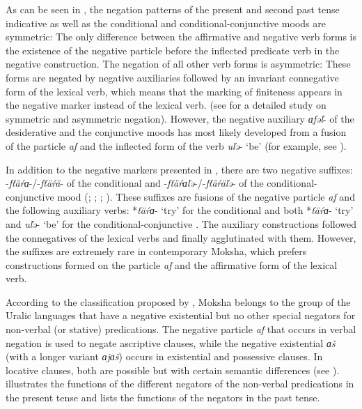\documentclass[output=paper,colorlinks,citecolor=brown,draft,draftmode]{langscibook}
\begin{document}
 As can be seen in , the negation patterns of the present and second past tense indicative as well as the conditional and conditional-conjunctive moods are symmetric: The only difference between the affirmative and negative verb forms is the existence of the negative particle before the inflected predicate verb in the negative construction. The negation of all other verb forms is asymmetric: These forms are negated by negative auxiliaries followed by an invariant connegative form of the lexical verb, which means that the marking of finiteness appears in the negative marker instead of the lexical verb. (see \citet{Miestamo2005} for a detailed study on symmetric and asymmetric negation). However, the negative auxiliary \textit{ɑfəľ}- of the desiderative and the conjunctive moods has most likely developed from a fusion of the particle \textit{af} and the inflected form of the verb \textit{uľə}- `be' (for example, see \citealt[142]{Bartens1999}).

  In addition to the negative markers presented in , there are two negative suffixes: -\textit{fťäŕɑ}-/-\textit{fťäŕä}- of the conditional and -\textit{fťäŕɑľə}-/-\textit{fťäŕäľə}- of the condi\-tion\-al-conjunctive mood (\citealt[392--393]{Klemm1934}; \citealt[012]{Paasonen1953}; \citealt[221]{Pall1957}; \citealt[141]{Bartens1999}).
  These suffixes are fusions of the negative particle \textit{af} and the following auxiliary verbs: *\textit{ťäŕɑ}- `try' for the conditional and both *\textit{ťäŕɑ}- `try' and \textit{uľə}- `be' for the conditional-conjunctive \citep[129--137]{Bartens1999}. The auxiliary constructions followed the connegatives of the lexical verbs and finally agglutinated with them. However, the suffixes are extremely rare in contemporary Moksha, which prefers constructions formed on the particle \textit{af} and the affirmative form of the lexical verb.

  According to the classification proposed by \citet{Veselinova2015}, Moksha belongs to the group of the Uralic languages that have a negative existential but no other special negators for non-verbal (or stative) predications. The negative particle \textit{af} that occurs in verbal negation is used to negate ascriptive clauses, while the negative existential \textit{ɑš} (with a longer variant \textit{ɑjɑš}) occurs in existential and possessive clauses. In locative clauses, both are possible but with certain semantic differences (see ).  illustrates the functions of the different negators of the non-verbal predications in the present tense and  lists the functions of the negators in the past tense.
\end{document}

